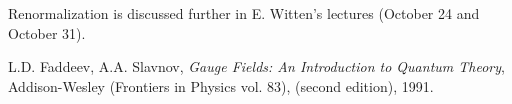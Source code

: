 Renormalization is discussed further in E. Witten's lectures (October 24
and October 31). 












\begin{thebibliography}{99}
 L.D. Faddeev, A.A.  Slavnov, {\em Gauge Fields: An Introduction 
to Quantum Theory}, Addison-Wesley (Frontiers in Physics vol. 83), (second 
edition), 1991. 
\end{thebibliography}




